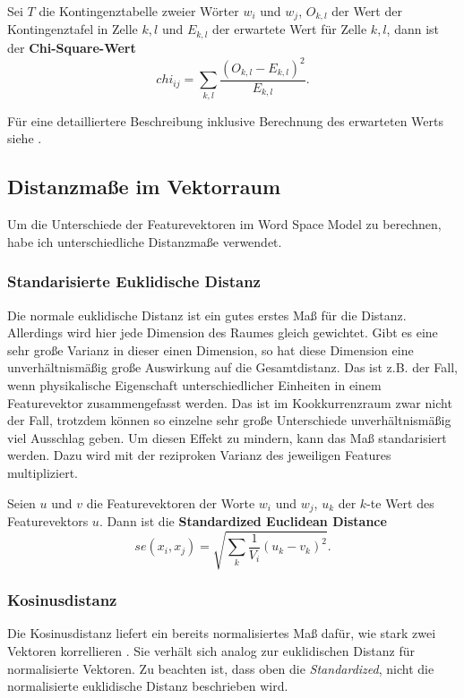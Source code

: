 \documentclass[11pt,numbers=noenddot]{scrartcl}
\begin{document}
Sei $T$ die Kontingenztabelle zweier Wörter $w_i$ und $w_j$, $O_{k,l}$ der Wert der Kontingenztafel in Zelle $k,l$ und $E_{k,l}$ der erwartete Wert für Zelle $k,l$, dann ist der \textbf{Chi-Square-Wert}
\begin{equation*}
   chi_{ij} = \sum_{k,l} { \frac{ (O_{k,l} - E_{k,l})^2} {E_{k,l}}  }.
\end{equation*}

Für eine detailliertere Beschreibung inklusive Berechnung des erwarteten Werts siehe \citet[S. 169ff.]{manning1999}.

\subsection{Distanzmaße im Vektorraum}

Um die Unterschiede der Featurevektoren im Word Space Model zu berechnen, habe ich unterschiedliche Distanzmaße verwendet.

\subsubsection{Standarisierte Euklidische Distanz} \label{eucl}

Die normale euklidische Distanz ist ein gutes erstes Maß für die Distanz. Allerdings wird hier jede Dimension des Raumes gleich gewichtet. Gibt es eine sehr große Varianz in dieser einen Dimension, so hat diese Dimension eine unverhältnismäßig große Auswirkung auf die Gesamtdistanz. Das ist z.B. der Fall, wenn physikalische Eigenschaft unterschiedlicher Einheiten in einem Featurevektor zusammengefasst werden. Das ist im Kookkurrenzraum zwar nicht der Fall, trotzdem können so einzelne sehr große Unterschiede unverhältnismäßig viel Ausschlag geben. Um diesen Effekt zu mindern, kann das Maß standarisiert werden. Dazu wird mit der reziproken Varianz des jeweiligen Features multipliziert.

Seien $u$ und $v$ die Featurevektoren der Worte $w_i$ und $w_j$, $u_k$ der $k$-te Wert des Featurevektors $u$. Dann ist die \textbf{Standardized Euclidean Distance}
$$
    se(x_i, x_j) = \sqrt{ \sum_{k} {\frac{1}{V_i}{ (u_k - v_k)^2 }} }.
$$

\subsubsection{Kosinusdistanz} \label{cosi}

Die Kosinusdistanz liefert ein bereits normalisiertes Maß dafür, wie stark zwei Vektoren korrellieren \citep[S. 300]{manning1999}. Sie verhält sich analog zur euklidischen Distanz für normalisierte Vektoren. Zu beachten ist, dass oben die \emph{Standardized}, nicht die normalisierte euklidische Distanz beschrieben wird.
\end{document}
